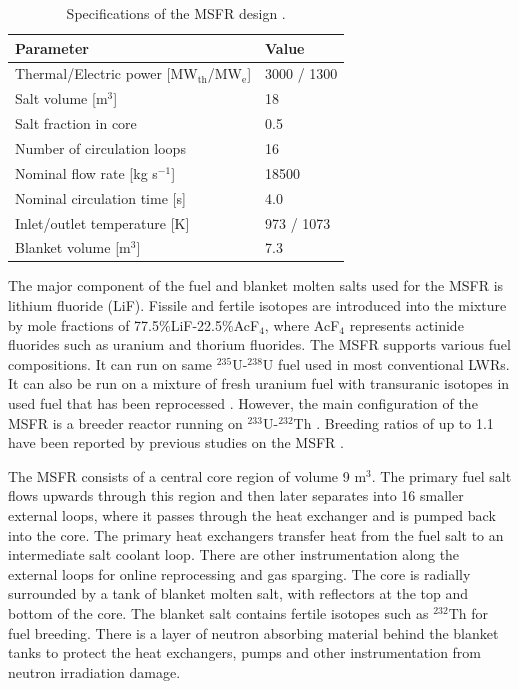 \documentclass{anstrans}
\begin{document}
\begin{table}
\begin{tabular}{ l l }
Parameter & Value \\
\hline
Thermal/Electric power [MW$_{\text{th}}$/MW$_{\text{e}}$] & 3000 / 1300  \\
Salt volume [m$^3$] & 18 \\
Salt fraction in core & 0.5 \\
Number of circulation loops & 16 \\
Nominal flow rate [kg s$^{-1}$] & 18500  \\
Nominal circulation time [s] & 4.0 \\
Inlet/outlet temperature [K] & 973 / 1073 \\
Blanket volume [m$^3$] & 7.3
\end{tabular}
\caption{Specifications of the MSFR design \cite{serp_molten_2014}.}
\label{table:msfr}
\end{table}

The major component of the fuel and blanket molten salts used for the MSFR is lithium fluoride (LiF). Fissile and fertile isotopes are introduced into the mixture by mole fractions of 77.5\%LiF-22.5\%AcF$_4$, where AcF$_4$ represents actinide fluorides such as uranium and thorium fluorides. The MSFR supports various fuel compositions. It can run on same $^{235}$U-$^{238}$U fuel used in most conventional LWRs. It can also be run on a mixture of fresh uranium fuel with transuranic isotopes in used fuel that has been reprocessed \cite{fiorina_investigation_2013}. However, the main configuration of the MSFR is a breeder reactor running on $^{233}$U-$^{232}$Th \cite{merle-lucotte_launching_2011}. Breeding ratios of up to 1.1 have been reported by previous studies on the MSFR \cite{fiorina_molten_2013}. 

The MSFR consists of a central core region of volume 9 m$^3$. The primary fuel salt flows upwards through this region and then later separates into 16 smaller external loops, where it passes through the heat exchanger and is pumped back into the core. The primary heat exchangers transfer heat from the fuel salt to an intermediate salt coolant loop. There are other instrumentation along the external loops for online reprocessing and gas sparging. The core is radially surrounded by a tank of blanket molten salt, with reflectors at the top and bottom of the core. The blanket salt contains fertile isotopes such as $^{232}$Th for fuel breeding. There is a layer of neutron absorbing material behind the blanket tanks to protect the heat exchangers, pumps and other instrumentation from neutron irradiation damage.
\end{document}
